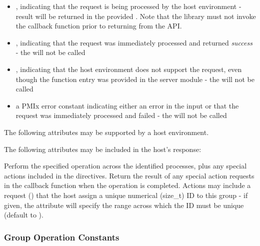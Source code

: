 \begin{itemize}
    \item {}, indicating that the request is being processed by the host environment - result will be returned in the provided . Note that the library must not invoke the callback function prior to returning from the \ac{API}.
    \item {}, indicating that the request was immediately processed and returned \textit{success} - the  will not be called
    \item {}, indicating that the host environment does not support the request, even though the function entry was provided in the server module - the  will not be called
    \item a PMIx error constant indicating either an error in the input or that the request was immediately processed and failed - the  will not be called
\end{itemize}

\optattrstart
The following attributes may be supported by a host environment.



The following attributes may be included in the host's response:


\optattrend

\descr

Perform the specified operation across the identified processes, plus any special actions included in the directives. Return the result of any special action requests in the callback function when the operation is completed. Actions may include a request () that the host assign a unique numerical (size_t) ID to this group - if given, the  attribute will specify the range across which the ID must be unique (default to ).

\subsubsection{Group Operation Constants}

